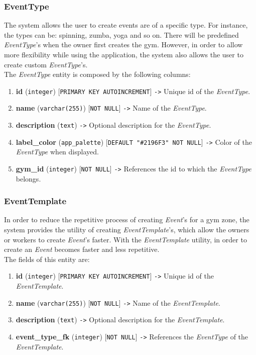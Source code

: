 \documentclass[a4paper, 12pt, oneside]{book}
\begin{document}
\subsubsection{EventType}
The system allows the user to create events are of a specific type. For instance, the types can be: spinning, zumba, yoga and so on. There will be predefined \emph{EventType}'s when the owner first creates the gym. However, in order to allow more flexibility while using the application, the system also allows the user to create custom \emph{EventType}'s.
\\[8pt]
The \emph{EventType} entity is composed by the following columns:
\begin{enumerate}[label = -]
	\item \textbf{id} (\texttt{integer}) [\texttt{PRIMARY KEY AUTOINCREMENT}] \texttt{->} Unique id of the \emph{EventType}.
	\item \textbf{name} (\texttt{varchar(255)}) [\texttt{NOT NULL}] \texttt{->} Name of the \emph{EventType}.
	\item \textbf{description} (\texttt{text}) \texttt{->} Optional description for the \emph{EventType}.
	\item \textbf{label\_color} (\texttt{app\_palette}) [\texttt{DEFAULT "\#2196F3" NOT NULL}] \texttt{->} Color of the \emph{EventType} when displayed.
	\item \textbf{gym\_id} (\texttt{integer}) [\texttt{NOT NULL}] \texttt{->} References the id to which the \emph{EventType} belongs.
\end{enumerate}
\subsubsection{EventTemplate}
In order to reduce the repetitive process of creating \emph{Event}'s for a gym zone, the system provides the utility of creating \emph{EventTemplate}'s, which allow the owners or workers to create \emph{Event}'s faster. With the \emph{EventTemplate} utility, in order to create an \emph{Event} becomes faster and less repetitive.
\\[8pt]
The fields of this entity are:
\begin{enumerate}[label = -]
	\item \textbf{id} (\texttt{integer}) [\texttt{PRIMARY KEY AUTOINCREMENT}] \texttt{->} Unique id of the \emph{EventTemplate}.
	\item \textbf{name} (\texttt{varchar(255)}) [\texttt{NOT NULL}] \texttt{->} Name of the \emph{EventTemplate}.
	\item \textbf{description} (\texttt{text}) \texttt{->} Optional description for the \emph{EventTemplate}.
	\item \textbf{event\_type\_fk} (\texttt{integer}) [\texttt{NOT NULL}] \texttt{->} References the \emph{EventType} of the \emph{EventTemplate}.
\end{enumerate}
\end{document}
